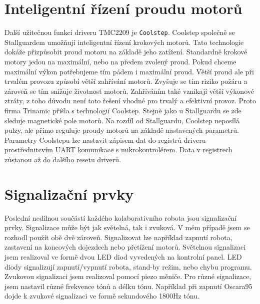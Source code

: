 \section{Inteligentní řízení proudu motorů}
Další užitečnou funkcí driveru TMC2209 je \texttt{Coolstep}. Coolstep společně se Stallguardem umožňují inteligentní řízení krokových motorů. Tato technologie dokáže přizpůsobit proud motoru na základě jeho zatížení. Standardně krokové motory jedou na maximální, nebo na předem zvolený proud.
Pokud chceme maximální výkon potřebujeme tím pádem i maximální proud. Větší proud ale při trvalém provozu způsobí větší zahřívání motorů. Zvyšuje se tím riziko požáru a zároveň se tím snižuje životnost motorů. Zahříváním také vznikají větší výkonové ztráty, z toho důvodu není toto řešení vhodné pro trvalý a efektivní provoz. Proto firma Trinamic přišla s technologií Coolstep. Stejně jako u Stallguardu se zde sleduje magnetické pole motorů. Na rozdíl od Stallguardu, Coolstep neposílá pulzy, ale přímo reguluje proudy motorů na základě nastavených parametrů. Parametry Coolstepu lze nastavit zápisem dat do registrů driveru prostřednitcvím UART komunikace s mikrokontrolérem. Data v registrech zůstanou až do dalšího resetu driverů.
\cite{TMC2209}

\section{Signalizační prvky}Poslední nedílnou součástí každého kolaborativního robota jsou signalizační prvky. Signalizace může být jak světelná, tak i zvuková. V mém případě jsem se rozhodl použít obě dvě zároveň. Signalizovat lze například zapnutí robota, zastavení na koncových dojezdech nebo přetížení motorů. Světelnou signalizaci jsem realizoval ve formě dvou LED diod vyvedených na kontrolní panel. LED diody signalizují zapnutí/vypnutí robota, stand-by režim, nebo chybu programu. Zvukovou signalizaci jsem realizoval pomocí piezo měniče. Pro různé signalizace, jsem nastavil různé frekvence tónů a délku tónu. Například při zapnutí Oscara95 dojde k zvukové signalizaci ve formě sekundového 1800Hz tónu. 
